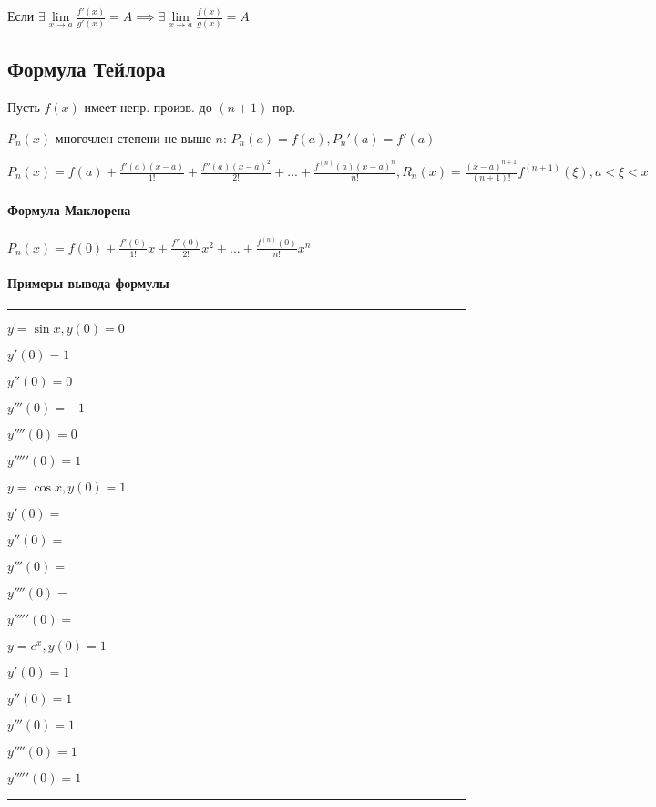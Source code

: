 \documentclass{article}
\begin{document}
\begin{flushleft}
Если $\exists \lim\limits_{x \to a} \frac{f'(x)}{g'(x)} = A \implies \exists \lim\limits_{x \to a} \frac{f(x)}{g(x)} = A$

\subsection{Формула Тейлора}

Пусть $f(x)$ имеет непр. произв. до  $(n + 1)$ пор.

$P_n(x)$ многочлен степени не выше $n$: $P_n(a) = f(a), P_n'(a) = f'(a)$

$P_n(x) = f(a) + \frac{f'(a)(x - a)}{1!} + \frac{f''(a) (x-a)^2}{2!} + ... + \frac{f^{(n)}(a)(x - a)^n}{n!}, R_n(x) = \frac{(x - a)^{n + 1}}{(n + 1)!} f^{(n + 1)} (\xi), a < \xi < x$

\paragraph{Формула Маклорена}

$P_n(x) = f(0) + \frac{f'(0)}{1!}x + \frac{f''(0)}{2!} x^2 + ... + \frac{f^{(n)}(0)}{n!}x^n$

\paragraph{Примеры вывода формулы}

\hfill

\rule{\textwidth}{0.4pt}

\parbox{0.3\textwidth}{
$y = \sin x, y(0) = 0$

$y'(0) = 1$

$y''(0) = 0$

$y'''(0) = -1 $

$y''''(0) = 0$

$y'''''(0) = 1$
}
\parbox{0.3\textwidth}{
$y = \cos x, y(0) = 1$

$y'(0) = $

$y''(0) = $

$y'''(0) = $

$y''''(0) = $

$y'''''(0) = $
}
\parbox{0.3\textwidth}{
$y = e^x, y(0) = 1$

$y'(0) = 1$

$y''(0) = 1$

$y'''(0) = 1$

$y''''(0) = 1$

$y'''''(0) = 1$
}

\rule{\textwidth}{0.4pt}


\end{flushleft}
\end{document}

